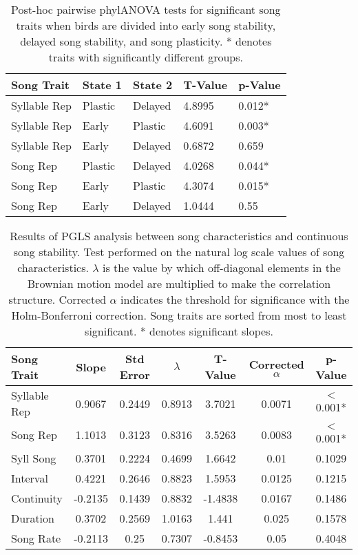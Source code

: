 \documentclass[a4paper,12pt]{article}
\begin{document}
\begin{table}[ht]
\caption{Post-hoc pairwise phylANOVA tests for significant song traits when birds are divided into early song stability, delayed song stability, and song plasticity.  * denotes traits with significantly different groups.}
\centering
\begin{tabular}{lllll}
  \hline
Song Trait & State 1 & State 2 & T-Value & p-Value \\ 
  \hline
Syllable Rep & Plastic & Delayed & 4.8995 & 0.012* \\ 
  Syllable Rep & Early & Plastic & 4.6091 & 0.003* \\ 
  Syllable Rep & Early & Delayed & 0.6872 & 0.659 \\ \hdashline
  Song Rep & Plastic & Delayed & 4.0268 & 0.044* \\ 
  Song Rep & Early & Plastic & 4.3074 & 0.015* \\ 
  Song Rep & Early & Delayed & 1.0444 & 0.55 \\ 
   \hline
\end{tabular}
\end{table}


\begin{table}[ht]
\caption{Results of PGLS analysis between song characteristics and continuous song stability. Test performed on the natural log scale values of song characteristics. $\lambda$ is the value by which off-diagonal elements in the Brownian motion model are multiplied to make the correlation structure.  Corrected $\alpha$ indicates the threshold for significance with the Holm-Bonferroni correction. Song traits are sorted from most to least significant. * denotes significant slopes.}
\centering
\begin{tabular}{lcccccc}
  \hline
Song Trait & Slope & Std Error & $\lambda$ & T-Value & Corrected $\alpha$ & p-Value \\ 
 \hline
Syllable Rep & 0.9067 & 0.2449 & 0.8913 & 3.7021 & 0.0071 & $<$0.001* \\ 
  Song Rep & 1.1013 & 0.3123 & 0.8316 & 3.5263 & 0.0083 & $<$0.001* \\ 
  Syll Song & 0.3701 & 0.2224 & 0.4699 & 1.6642 & 0.01 & 0.1029 \\ 
  Interval & 0.4221 & 0.2646 & 0.8823 & 1.5953 & 0.0125 & 0.1215 \\ 
  Continuity & -0.2135 & 0.1439 & 0.8832 & -1.4838 & 0.0167 & 0.1486 \\ 
  Duration & 0.3702 & 0.2569 & 1.0163 & 1.441 & 0.025 & 0.1578 \\ 
  Song Rate & -0.2113 & 0.25 & 0.7307 & -0.8453 & 0.05 & 0.4048 \\ 
   \hline
\end{tabular}
\end{table}
\end{document}
